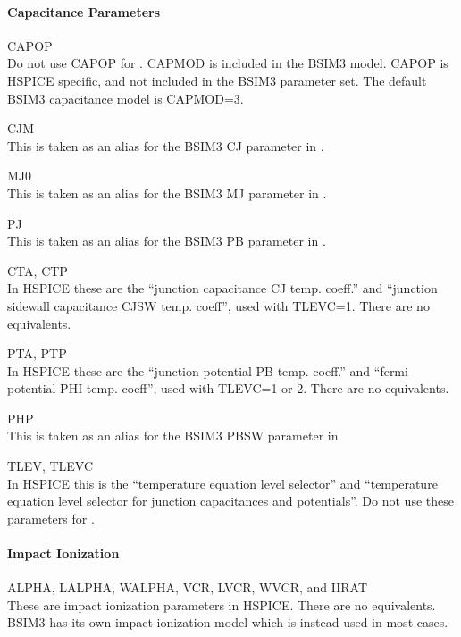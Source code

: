 \paragraph{Capacitance Parameters}

\begin{description}
\item{\vt CAPOP}\\
 Do not use {\vt CAPOP} for {\WRspice}.  {\vt CAPMOD} is included in
 the BSIM3 model.  {\vt CAPOP} is HSPICE specific, and not included in
 the BSIM3 parameter set.  The default BSIM3 capacitance model is {\vt
 CAPMOD=3}.
\item{\vt CJM}\\
 This is taken as an alias for the BSIM3 {\vt CJ} parameter in
 {\WRspice}.
\item{\vt MJ0}\\
 This is taken as an alias for the BSIM3 {\vt MJ} parameter in
 {\WRspice}.
\item{\vt PJ}\\
 This is taken as an alias for the BSIM3 {\vt PB} parameter in
 {\WRspice}.
\item{{\vt CTA}, {\vt CTP}}\\
 In HSPICE these are the ``junction capacitance CJ temp.  coeff.'' and
 ``junction sidewall capacitance CJSW temp.  coeff'', used with {\vt
 TLEVC=1}.  There are no {\WRspice} equivalents.
\item{{\vt PTA}, {\vt PTP}}\\
 In HSPICE these are the ``junction potential PB temp.  coeff.'' and
 ``fermi potential PHI temp.  coeff'', used with {\vt TLEVC=}1 or 2. 
 There are no {\WRspice} equivalents.
\item{\vt PHP}\\
 This is taken as an alias for the BSIM3 {\vt PBSW} parameter in
 {\WRspice}
\item{{\vt TLEV}, {\vt TLEVC}}\\
 In HSPICE this is the ``temperature equation level selector'' and
 ``temperature equation level selector for junction capacitances and
 potentials''.  Do not use these parameters for {\WRspice}.
\end{description}

\paragraph{Impact Ionization}

\begin{description}
\item{{\vt ALPHA}, {\vt LALPHA}, {\vt WALPHA}, {\vt VCR}, {\vt LVCR},
 {\vt WVCR}, and {\vt IIRAT}}\\
 These are impact ionization parameters in HSPICE.  There are no
 {\WRspice} equivalents.  BSIM3 has its own impact ionization model
 which is instead used in most cases.
\end{description}

